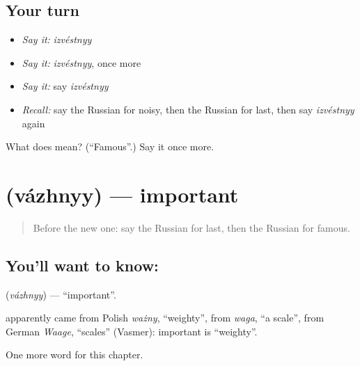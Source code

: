 \subsection*{Your turn}
\begin{itemize}
\raggedright
  \item \emph{Say it:} \emph{izvéstnyy}
  \item \emph{Say it:} \emph{izvéstnyy}, once more
  \item \emph{Say it:} say \emph{izvéstnyy}
  \item \emph{Recall:} say the Russian for noisy, then the Russian for last, then say \emph{izvéstnyy} again
\end{itemize}

\begin{tcolorbox}[breakable,colback=teal!4,colframe=teal!35!black,title={Before you move on}]
What does  mean? (\textquotedblleft{}Famous\textquotedblright{}.) Say it once more.
\end{tcolorbox}
\section[\texorpdfstring{\ru{важный} (vázhnyy)}{важный (vázhnyy)}]{ (vázhnyy) — important}

\label{lesson:RU-C126-important}



\begin{quote}
Before the new one: say the Russian for last, then the Russian for famous.
\end{quote}

\subsection*{You'll want to know: }
\textbf{} (\emph{vázhnyy}) — \textquotedblleft{}important\textquotedblright{}.

\begin{cousinweb}
\textbf{} apparently came from Polish \emph{ważny}, \textquotedblleft{}weighty\textquotedblright{}, from \emph{waga}, \textquotedblleft{}a scale\textquotedblright{}, from German \emph{Waage}, \textquotedblleft{}scales\textquotedblright{} (Vasmer): important is \textquotedblleft{}weighty\textquotedblright{}.
\end{cousinweb}

\begin{grammarlens}[title={What you've built}]
One more word for this chapter.
\end{grammarlens}

